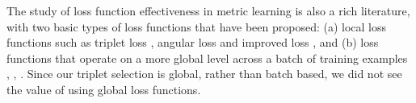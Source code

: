 The study of loss function effectiveness in metric learning is also a rich literature, with two basic types of loss functions that have been proposed: (a) local loss functions such as triplet loss \cite{DBLP:conf/cvpr/SchroffKP15}, angular loss \cite{Zhang:2016:DML:3088616.3088665} and improved loss \cite{DBLP:journals/corr/abs-1708-01682}, and (b) loss functions that operate on a more global level across a batch of training examples \cite{NIPS2016_6200}, \cite{DBLP:conf/cvpr/SongXJS16}, \cite{songCVPR17}.   Since our triplet selection is global, rather than batch based, we did not see the value of using global loss functions.
